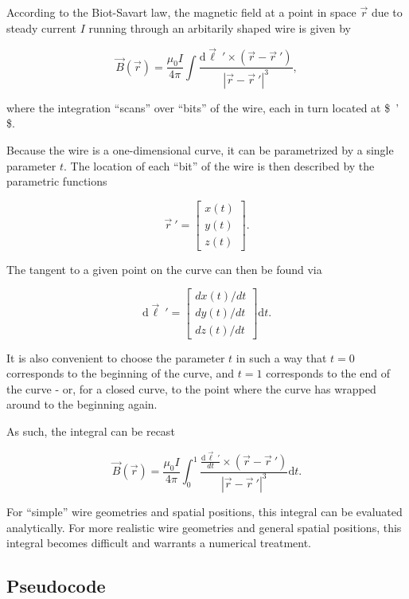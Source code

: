 \documentclass[]{article}
\begin{document}
According to the Biot-Savart law, the magnetic field at a point in space
\(\vec{r}\) due to steady current \(I\) running through an arbitarily
shaped wire is given by

\[ \vec{B}\left(\vec{r}\right) = \frac{\mu_0 I}{4\pi}\int\left. \frac{\mathrm{d}\vec{\ell}\ ' \times\left(\vec{r}-\vec{r}\ ' \right)}{\left\vert \vec{r} - \vec{r}\ ' \right\vert^{3}}\right. , \]

where the integration ``scans'' over ``bits'' of the wire, each in turn
located at \$~' \$.

Because the wire is a one-dimensional curve, it can be parametrized by a
single parameter \(t\). The location of each ``bit'' of the wire is then
described by the parametric functions

\[ \vec{r}\ ' = \left\lbrack\begin{array}{c} x(t) \\ y(t) \\ z(t) \end{array} \right\rbrack . \]

The tangent to a given point on the curve can then be found via

\[ \mathrm{d}\vec{\ell}\ ' = \left\lbrack\begin{array}{c} dx(t)/dt \\ dy(t)/dt \\ dz(t)/dt \end{array} \right\rbrack \mathrm{d}t. \]

It is also convenient to choose the parameter \(t\) in such a way that
\(t=0\) corresponds to the beginning of the curve, and \(t=1\)
corresponds to the end of the curve - or, for a closed curve, to the
point where the curve has wrapped around to the beginning again.

As such, the integral can be recast

\[ \vec{B}\left(\vec{r}\right) = \frac{\mu_0 I}{4\pi}\int_0^1\left. \frac{\frac{\mathrm{d}\vec{\ell}\ ' }{dt}\times\left(\vec{r}-\vec{r}\ ' \right)}{\left\vert \vec{r} - \vec{r}\ ' \right\vert^{3}}\right. \mathrm{d}t . \]

For ``simple'' wire geometries and spatial positions, this integral can
be evaluated analytically. For more realistic wire geometries and
general spatial positions, this integral becomes difficult and warrants
a numerical treatment.

\subsection{Pseudocode}\label{pseudocode}
\end{document}
